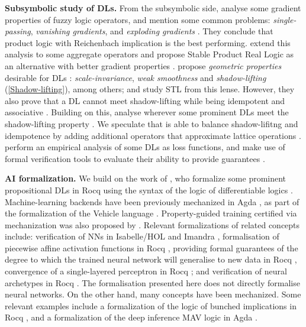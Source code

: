 \textbf{Subsymbolic study of DLs.} From the subsymbolic side, \citeauthor{van2022analyzing} analyse some gradient properties of fuzzy logic operators, and mention some common problems: \emph{single-passing}, \emph{vanishing gradients}, and \emph{exploding gradients} \cite{van2022analyzing}. They conclude that product logic with Reichenbach implication is the best performing. \citeauthor{badreddine2022logic} extend this analysis to some aggregate operators and propose Stable Product Real Logic as an alternative with better gradient properties \citep{badreddine2022logic}. \citeauthor{varnai2020robustness} propose \emph{geometric properties} desirable for DLs \citep{varnai2020robustness}:  \emph{scale-invariance}, \emph{weak smoothness} and \emph{shadow-lifting} (\cref{Shadow-lifting}), among others;  and study STL \citep{varnai2020robustness} from this lense. However, they also prove that a DL cannot meet shadow-lifting while being idempotent and associative \citep{varnai2020robustness}. Building on this, \citeauthor{affeldt2024taming} analyse wherever some prominent DLs  meet the shadow-lifting property \citep{affeldt2024taming, varnai2020robustness}. We speculate that \citeauthor{capucci2024quantifiers} is able to balance shadow-lifitng and idempotence by adding additional operators that approximate lattice operations \citep{capucci2024quantifiers}. \citeauthor{FLINKOW2025103280} perform an empirical analysis of some DLs as loss functions, and make use of formal verification tools to evaluate their ability to provide guarantees \citep{FLINKOW2025103280}. 

\textbf{AI formalization.} We build on the work of \citeauthor{affeldt2024taming}, who formalize some prominent propositional DLs in Rocq \citep{affeldt2024taming} using the syntax of the logic of differentiable logics \cite{slusarz2023logic}. Machine-learning backends have been previously mechanized in Agda \citep{agdaDL}, as part of the formalization of the Vehicle language \citep{vehicle}.  Property-guided training certified via mechanization was also proposed by \citeauthor{chevallier2022constrainedtrainingneuralnetworks} \citep{chevallier2022constrainedtrainingneuralnetworks}. Relevant formalizations of \SuAI{} related concepts include: verification of NNs in Isabelle/HOL \citep{10.1007/978-3-031-27481-7_24} and Imandra \citep{10.1145/3551357.3551372}, formalisation of piecewise affine activation functions in Rocq \citep{10.1007/978-3-031-33170-1_4}, providing formal guarantees of the degree to which the trained neural network will generalise to new data in Rocq \citep{Bagnall_Stewart_2019}, convergence of a single-layered perceptron in Rocq \citep{10.1145/3088525.3088673}; and verification of neural archetypes in Rocq \citep{DeMaria2021}. The formalisation presented here does not directly formalise neural networks. On the other hand, many \SiAI{} concepts have been mechanized. Some relevant examples include a formalization of the logic of bunched implications in Rocq \citep{10.1145/3497775.3503690}, and a formalization of the deep inference MAV logic in Agda \citep{Atkey2024}. 
